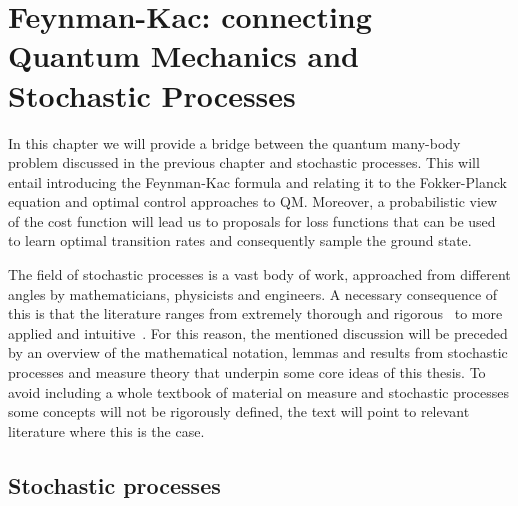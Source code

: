 
\newtheorem{theorem}{Theorem}[section]
\newtheorem{corollary}{Corollary}[theorem]
\newtheorem{lemma}[theorem]{Lemma}
\newtheorem{definition}{Definition}[section]

\chapter{Feynman-Kac: connecting Quantum Mechanics and Stochastic Processes}
\label{chapter3}

\ifpdf
    \graphicspath{{Chapter3/Figs/Raster/}{Chapter3/Figs/PDF/}{Chapter3/Figs/}}
\else
    \graphicspath{{Chapter3/Figs/Vector/}{Chapter3/Figs/}}
\fi
In this chapter we will provide a bridge between the quantum many-body problem discussed in the previous chapter and stochastic processes. This will entail introducing the Feynman-Kac formula and relating it to the Fokker-Planck equation and optimal control approaches to QM. Moreover, a probabilistic view of the cost function will lead us to proposals for loss functions that can be used to learn optimal transition rates and consequently sample the ground state.

The field of stochastic processes is a vast body of work, approached from different angles by mathematicians, physicists and engineers. A necessary consequence of this is that the literature ranges from extremely thorough and rigorous~\cite{rogers1994diffusions, rogers2000diffusions} to more applied and intuitive~\cite{sarkka2019applied}. For this reason, the mentioned discussion will be preceded by an overview of the mathematical notation, lemmas and results from stochastic processes and measure theory that underpin some core ideas of this thesis. To avoid including a whole textbook of material on measure and stochastic processes some concepts will not be rigorously defined, the text will point to relevant literature where this is the case.

\section{Stochastic processes}
\label{subsec:fk-stoch}
